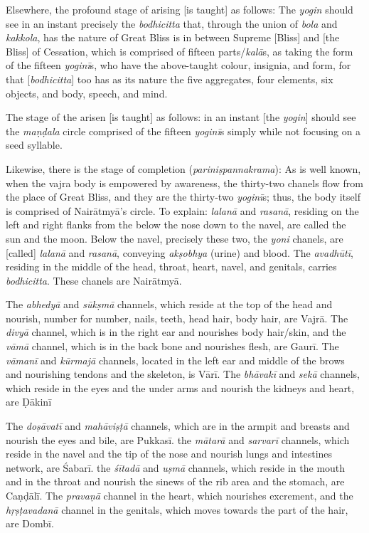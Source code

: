 \documentclass[naipra.tex]{subfiles}
\begin{document}
Elsewhere, the profound stage of arising [is taught] as follows: The \emph{yogin} should see in an instant precisely the \emph{bodhicitta} that, through the union of \emph{bola} and \emph{kakkola}, has the nature of Great Bliss is in between Supreme [Bliss] and [the Bliss] of Cessation, which is comprised of fifteen parts/\emph{kalā}s, as taking the form of the fifteen \emph{yoginī}s, who have the above-taught colour, insignia, and form, for that [\emph{bodhicitta}] too has as its nature the five aggregates, four elements, six objects, and body, speech, and mind.

The stage of the arisen [is taught] as follows: in an instant [the \emph{yogin}] should see the \emph{maṇḍala} circle comprised of the fifteen \emph{yoginī}s simply while \crux not \crux focusing on a seed syllable.

Likewise, there is the stage of completion (\emph{pariniṣpannakrama}):
As is well known, when the vajra body is empowered by awareness, the thirty-two chanels flow from the place of Great Bliss, and they are the thirty-two \emph{yoginī}s; thus, the body itself is comprised of Nairātmyā's circle.
To explain: \emph{lalanā} and \emph{rasanā}, residing on the left and right flanks from the below the nose down to the navel, are called the sun and the moon.
Below the navel, precisely these two, the \emph{yoni} chanels, are [called] \emph{lalanā} and \emph{rasanā}, conveying \emph{akṣobhya} (urine) and blood.
The \emph{avadhūtī}, residing in the middle of the head, throat, heart, navel, and genitals, carries \emph{bodhicitta}.
These chanels are Nairātmyā.

The \emph{abhedyā} and \emph{sūkṣmā} channels, which reside at the top of the head and nourish, number for number, nails, teeth, head hair, body hair, are Vajrā.
The \emph{divyā} channel, which is in the right ear and nourishes body hair/skin, and the \emph{vāmā} channel, which is in the back bone and nourishes flesh, are Gaurī.
The \emph{vāmanī} and \emph{kūrmajā} channels, located in the left ear and middle of the brows and nourishing tendons and the skeleton, is Vārī.
The \emph{bhāvakī} and \emph{sekā} channels, which reside in the eyes and the under arms and nourish the kidneys and heart, are Ḍākinī

The \emph{doṣāvatī} and \emph{mahāviṣṭā} channels, which are in the armpit and breasts and nourish the eyes and bile, are Pukkasī.
the \emph{mātarā} and \emph{sarvarī} channels, which reside in the navel and the tip of the nose and nourish lungs and intestines network, are Śabarī.
the \emph{śītadā} and \emph{uṣmā} channels, which reside in the mouth and in the throat and nourish the sinews of the rib area and the stomach, are Caṇḍālī.
The \emph{pravaṇā} channel in the heart, which nourishes excrement, and the \emph{hṛṣṭavadanā} channel in the genitals, which moves towards the part of the hair, are Dombī.
\end{document}

